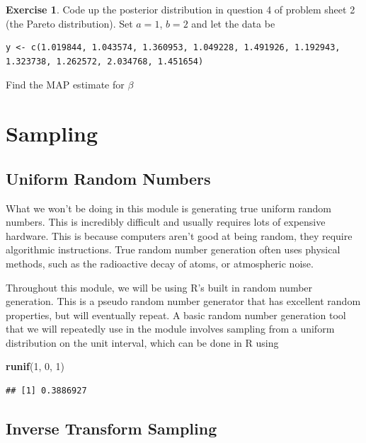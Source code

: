 \documentclass[
]{book}
\newenvironment{Shaded}{\begin{snugshade}}{\end{snugshade}}
\newcommand{\DecValTok}[1]{\textcolor[rgb]{0.00,0.00,0.81}{#1}}
\newcommand{\FunctionTok}[1]{\textcolor[rgb]{0.13,0.29,0.53}{\textbf{#1}}}
\newcommand{\NormalTok}[1]{#1}
\theoremstyle{definition}
\theoremstyle{definition}
\theoremstyle{definition}
\newtheorem{exercise}{Exercise}[chapter]
\theoremstyle{definition}
\theoremstyle{remark}
\begin{document}
\begin{exercise}
Code up the posterior distribution in question 4 of problem sheet 2 (the Pareto distribution). Set \(a = 1\), \(b = 2\) and let the data be

\begin{verbatim}
y <- c(1.019844, 1.043574, 1.360953, 1.049228, 1.491926, 1.192943, 1.323738, 1.262572, 2.034768, 1.451654)
\end{verbatim}

Find the MAP estimate for \(\beta\)
\end{exercise}

\chapter{Sampling}\label{sampling}

\section{Uniform Random Numbers}\label{uniform-random-numbers}

What we won't be doing in this module is generating true uniform random numbers. This is incredibly difficult and usually requires lots of expensive hardware. This is because computers aren't good at being random, they require algorithmic instructions. True random number generation often uses physical methods, such as the radioactive decay of atoms, or atmospheric noise.

Throughout this module, we will be using R's built in random number generation. This is a pseudo random number generator that has excellent random properties, but will eventually repeat. A basic random number generation tool that we will repeatedly use in the module involves sampling from a uniform distribution on the unit interval, which can be done in R using

\begin{Shaded}
\begin{Highlighting}[]
\FunctionTok{runif}\NormalTok{(}\DecValTok{1}\NormalTok{, }\DecValTok{0}\NormalTok{, }\DecValTok{1}\NormalTok{)}
\end{Highlighting}
\end{Shaded}

\begin{verbatim}
## [1] 0.3886927
\end{verbatim}

\section{Inverse Transform Sampling}\label{inverse-transform-sampling}
\end{document}
